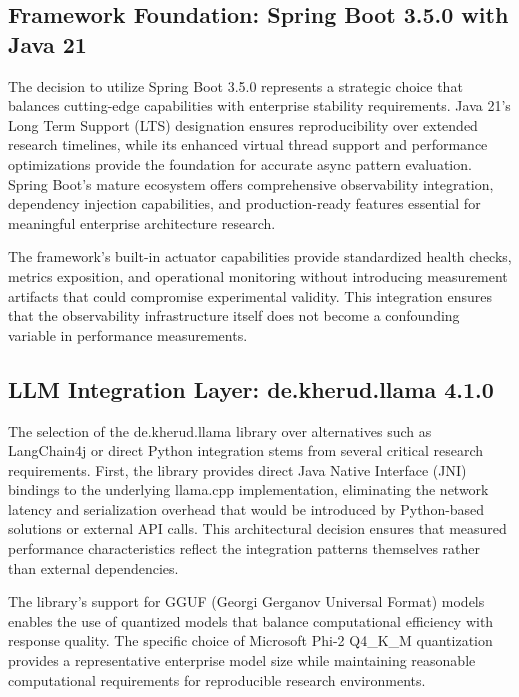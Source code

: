 \subsection{Framework Foundation: Spring Boot 3.5.0 with Java 21}

The decision to utilize Spring Boot 3.5.0 represents a strategic choice that balances cutting-edge capabilities with enterprise stability requirements. Java 21's Long Term Support (LTS) designation ensures reproducibility over extended research timelines, while its enhanced virtual thread support and performance optimizations provide the foundation for accurate async pattern evaluation. Spring Boot's mature ecosystem offers comprehensive observability integration, dependency injection capabilities, and production-ready features essential for meaningful enterprise architecture research.

The framework's built-in actuator capabilities provide standardized health checks, metrics exposition, and operational monitoring without introducing measurement artifacts that could compromise experimental validity. This integration ensures that the observability infrastructure itself does not become a confounding variable in performance measurements.

\subsection{LLM Integration Layer: de.kherud.llama 4.1.0}

The selection of the de.kherud.llama library over alternatives such as LangChain4j or direct Python integration stems from several critical research requirements. First, the library provides direct Java Native Interface (JNI) bindings to the underlying llama.cpp implementation, eliminating the network latency and serialization overhead that would be introduced by Python-based solutions or external API calls. This architectural decision ensures that measured performance characteristics reflect the integration patterns themselves rather than external dependencies.

The library's support for GGUF (Georgi Gerganov Universal Format) models enables the use of quantized models that balance computational efficiency with response quality. The specific choice of Microsoft Phi-2 Q4\_K\_M quantization provides a representative enterprise model size while maintaining reasonable computational requirements for reproducible research environments.

